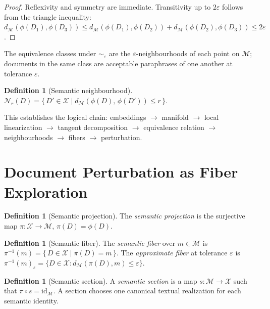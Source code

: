 \documentclass[12pt, a4paper]{article}
\theoremstyle{plain}
\theoremstyle{definition}
\newtheorem{definition}[theorem]{Definition}
\theoremstyle{remark}
\newcommand{\calX}{\mathcal{X}}
\newcommand{\calM}{\mathcal{M}}
\newcommand{\vpi}{\pi}
\newcommand{\ve}{\varepsilon}
\newcommand{\dM}{d_{\calM}}
\newcommand{\fiber}[1]{\vpi^{-1}(#1)}
\begin{document}
\begin{proof}
Reflexivity and symmetry are immediate.  Transitivity up to $2\ve$ follows from
the triangle inequality: $\dM(\phi(D_1), \phi(D_3)) \le \dM(\phi(D_1),
\phi(D_2)) + \dM(\phi(D_2), \phi(D_3)) \le 2\ve$.
\end{proof}

The equivalence classes under $\sim_\ve$ are the $\ve$-neighbourhoods of each
point on $\calM$; documents in the same class are acceptable paraphrases of one
another at tolerance $\ve$.

\begin{definition}[Semantic neighbourhood]
\label{def:neighbourhood}
$\mathcal{N}_r(D) = \{\, D' \in \calX \mid \dM(\phi(D),\, \phi(D')) \le r\,\}$.
\end{definition}

This establishes the logical chain:
embeddings $\to$ manifold $\to$ local linearization $\to$ tangent decomposition
$\to$ equivalence relation $\to$ neighbourhoods $\to$ fibers $\to$ perturbation.


\section{Document Perturbation as Fiber Exploration}
\label{sec:fiber}

\begin{definition}[Semantic projection]
\label{def:projection}
The \emph{semantic projection} is the surjective map
$\vpi : \calX \to \calM$, $\vpi(D) = \phi(D)$.
\end{definition}

\begin{definition}[Semantic fiber]
\label{def:fiber}
The \emph{semantic fiber} over $m \in \calM$ is
$\fiber{m} = \{\, D \in \calX \mid \vpi(D) = m\,\}$.
The \emph{approximate fiber} at tolerance $\ve$ is
$\fiber{m}_\ve = \{D \in \calX : \dM(\vpi(D), m) \le \ve\}$.
\end{definition}

\begin{definition}[Semantic section]
\label{def:section}
A \emph{semantic section} is a map $s : \calM \to \calX$ such that
$\vpi \circ s = \mathrm{id}_{\calM}$.  A section chooses one canonical textual
realization for each semantic identity.
\end{definition}
\end{document}
